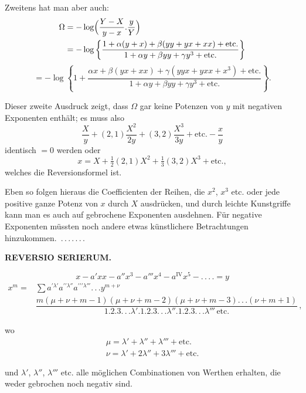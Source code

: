 \noindent\hspace*{\parindent}Zweitens hat man aber auch:
\[
\begin{aligned}\Omega &=-\log\Bigl(\dfrac{Y-X}{y-x} . \dfrac{y}{Y}\Bigr)\\ &=-\log\left\{\dfrac{1+\alpha(y+x)+\beta(yy+yx+xx)+\text{etc.}}{1+\alpha y+\beta yy+\gamma y^3+\text{etc.}}\right\}
\end{aligned}
\]
\[
=-\log\left\{1+\dfrac{\alpha x+\beta(yx+xx)+\gamma(yyx+yxx+x^3)+\text{etc.}}{1+\alpha y+\beta yy+\gamma y^3+\text{etc.}}\right\}.
\]

\noindent\hspace*{\parindent}Dieser zweite Ausdruck zeigt, dass $\Omega$ gar keine Potenzen von $y$ mit negativen Exponenten
enthält; es muss also
\[
\dfrac{X}{y}+(2,1)\dfrac{X^2}{2y}+(3,2)\dfrac{X^3}{3y}+\text{etc.}-\dfrac{x}{y}
\]
\noindent identisch $=0$ werden oder
\[
x=X+\tfrac{1}{2}(2,1)X^2+\tfrac{1}{3}(3,2)X^3+\text{etc.},
\]
\noindent welches die Reversionsformel ist.

Eben so folgen hieraus die Coefficienten der Reihen, die $x^2$, $x^3$ etc. oder jede positive ganze
Potenz von $x$ durch $X$ ausdrücken, und durch leichte Kunstgriffe kann man es auch auf gebrochene
Exponenten ausdehnen. Für negative Exponenten müssten noch andere etwas künstlichere Betrachtungen
\mbox{hinzukommen. .\,.\,.\,.\,.\,.\,.}



\begin{center}
\textbf{REVERSIO SERIERUM.}
\end{center}

\[
x-a'xx-a''x^3-a'''x^4-a^{\mathrm{IV}}x^5-.\,.\,.\,.=y
\]
\[
\begin{aligned}x^m={}&\sum a^{\prime\lambda'}a^{\prime\prime\lambda''}a^{\prime\prime\prime\lambda'''}.\,.\,. y^{m+\nu}\,\\
&\dfrac{m(\mu+\nu+m-1)(\mu+\nu+m-2)(\mu+\nu+m-3).\,.\,.(\nu+m+1)}
{1.2.3.\,.\,.\lambda'.1.2.3.\,.\,.\lambda''.1.2.3.\,.\,.\lambda'''\,\text{etc.}}\,,
\end{aligned}
\]

\noindent wo
\[
\begin{array}{l}
\mu=\lambda'+\lambda''+\lambda'''+\text{etc.}\\[4pt]
\nu=\lambda'+2\lambda''+3\lambda'''+\text{etc.}
\end{array}
\]

\noindent und $\lambda'$, $\lambda''$, $\lambda'''$ etc. alle möglichen Combinationen von Werthen erhalten,
die weder gebrochen noch negativ sind.

